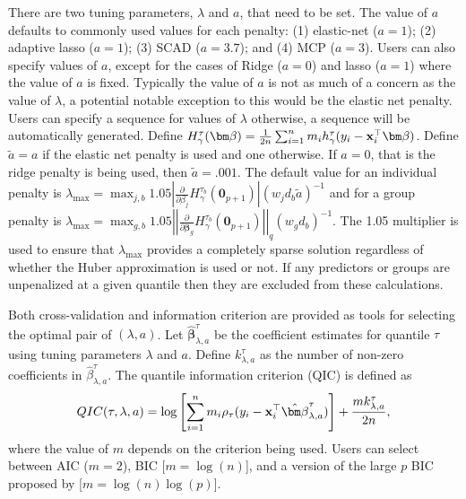 There are two tuning parameters, \(\lambda\) and \(a\), that need to be set. The value of \(a\) defaults to commonly used values for each penalty: (1) elastic-net (\(a=1\)); (2) adaptive lasso (\(a=1\)); (3) SCAD (\(a=3.7\)); and (4) MCP (\(a=3\)). Users can also specify values of \(a\), except for the cases of Ridge (\(a=0\)) and lasso (\(a=1\)) where the value of \(a\) is fixed. Typically the value of \(a\) is not as much of a concern as the value of \(\lambda\), a potential notable exception to this would be the elastic net penalty. Users can specify a sequence for values of \(\lambda\) otherwise, a sequence will be automatically generated. Define \(H_\gamma^\tau(\bm \beta) = \frac{1}{2n} \sum_{i=1}^n m_i h_\gamma^\tau(y_i - {\bf x}_i^\top\bm \beta)\). Define \(\tilde{a}=a\) if the elastic net penalty is used and one otherwise. If \(a=0\), that is the ridge penalty is being used, then \(\tilde{a}=.001\). The default value for an individual penalty is \(\lambda_{\max} = \max_{j,b} 1.05\left|\frac{\partial}{\partial \beta_j} H_\gamma^{\tau_b}(\mathbf{0}_{p+1})\right|(w_jd_b\tilde{a})^{-1}\) and for a group penalty is \(\lambda_{\max} = \max_{g,b} 1.05\left|\left| \frac{\partial}{\partial \bm \beta_g} H_\gamma^{\tau_b}(\mathbf{0}_{p+1})\right|\right|_q (w_gd_b)^{-1}\). The 1.05 multiplier is used to ensure that \(\lambda_{\max}\) provides a completely sparse solution regardless of whether the Huber approximation is used or not. If any predictors or groups are unpenalized at a given quantile then they are excluded from these calculations.

Both cross-validation and information criterion are provided as tools for selecting the optimal pair of \((\lambda,a)\). Let \(\hat{\bm \beta}^\tau_{\lambda,a}\) be the coefficient estimates for quantile \(\tau\) using tuning parameters \(\lambda\) and \(a\). Define \(k^\tau_{\lambda,a}\) as the number of non-zero coefficients in \(\hat{\beta}_{\lambda,a}^\tau\). The quantile information criterion (QIC) is defined as
\begin{equation}
QIC(\tau,\lambda,a) = \log\left[ \sum_{i=1}^n m_i \rho_\tau(y_i-{\bf x}_i^\top \hat{\bm \beta}^\tau_{\lambda,a}) \right] + \frac{mk^\tau_{\lambda,a}}{2n},
\label{eq:qic}
\end{equation}
where the value of \(m\) depends on the criterion being used. Users can select between AIC (\(m=2\)), BIC {[}\(m=\log(n)\){]}, and a version of the large \(p\) BIC proposed by \citet{qrbic} {[}\(m=\log(n)\log(p)\){]}.

